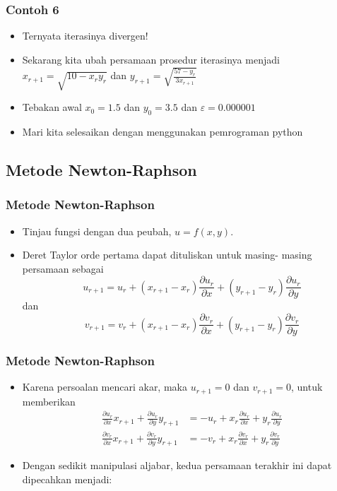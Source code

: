 \documentclass[pdflatex,compress]{beamer}
\begin{document}
\begin{frame}
	\frametitle{Contoh 6}
	\begin{itemize}
		\item Ternyata iterasinya divergen!
		\item Sekarang kita ubah persamaan prosedur iterasinya menjadi $ x_{r+1} = \sqrt{10-x_r y_r} $ dan $ y_{r+1} = \sqrt{\frac{57-y_r}{3x_{r+1}}}$
		\item Tebakan awal $ x_0 = 1.5 $ dan $ y_0 = 3.5 $ dan $\varepsilon = 0.000001$
		\item Mari kita selesaikan dengan menggunakan pemrograman python
	\end{itemize}
\end{frame}

\subsection{Metode Newton-Raphson}

\begin{frame}
	\frametitle{Metode Newton-Raphson}
	\begin{itemize}
		\item Tinjau fungsi dengan dua peubah, $ u = f(x, y) $.
		\item Deret Taylor orde pertama dapat dituliskan untuk masing- masing persamaan sebagai
		\[ u_{r+1} = u_r + (x_{r+1} - x_r)\frac{\partial u_r}{\partial x} + (y_{r+1} - y_r)\frac{\partial u_r}{\partial y} \] dan 
		\[ v_{r+1} = v_r + (x_{r+1} - x_r)\frac{\partial v_r}{\partial x} + (y_{r+1} - y_r)\frac{\partial v_r}{\partial y} \]
	\end{itemize}
\end{frame}

\begin{frame}
	\frametitle{Metode Newton-Raphson}
	\begin{itemize}
		\item Karena persoalan mencari akar, maka $ u_{r+1} = 0 $ dan $ v_{r+1} = 0 $, untuk memberikan
		\begin{align*}
			\frac{\partial u_r}{\partial x}x_{r+1} + \frac{\partial u_r}{\partial y}y_{r+1} &= -u_r + x_r \frac{\partial u_r}{\partial x} + y_r\frac{\partial u_r}{\partial y} \\
			\frac{\partial v_r}{\partial x}x_{r+1} + \frac{\partial v_r}{\partial y}y_{r+1} &= -v_r + x_r \frac{\partial v_r}{\partial x} + y_r\frac{\partial v_r}{\partial y}
		\end{align*}
		\item Dengan sedikit manipulasi aljabar, kedua persamaan terakhir ini dapat dipecahkan menjadi:
	\end{itemize}
\end{frame}
\end{document}
